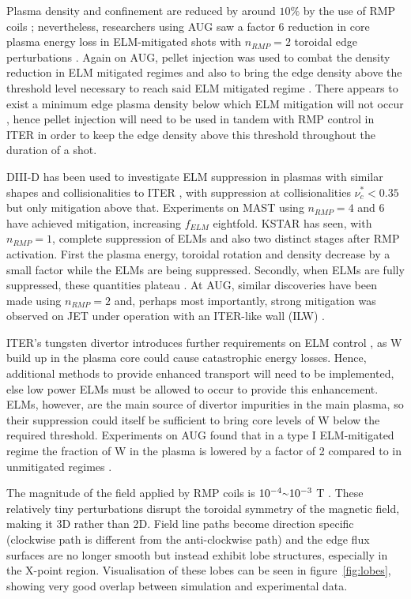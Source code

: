 \documentclass[11pt, twocolumn]{article}  %
\providecommand{\squiggle}{\raise.17ex\hbox{$\scriptstyle\sim$}} %
\begin{document}
Plasma density and confinement are reduced by around $10\%$ by the use of RMP coils \cite{Lang2013}; nevertheless, researchers using AUG saw a factor 6 reduction in core plasma energy loss in ELM-mitigated shots with $n_{RMP}=2$ toroidal edge perturbations \cite{Suttrop2011}. Again on AUG, pellet injection was used to combat the density reduction in ELM mitigated regimes and also to bring the edge density above the threshold level necessary to reach said ELM mitigated regime \cite{Lang2012}. There appears to exist a minimum edge plasma density below which ELM mitigation will not occur \cite{Suttrop2011}, hence pellet injection will need to be used in tandem with RMP control in ITER in order to keep the edge density above this threshold throughout the duration of a shot.

DIII-D has been used to investigate ELM suppression in plasmas with similar shapes and collisionalities to ITER \cite{Evans2008,Lanctot2013,Mordijck2011}, with suppression at collisionalities $\nu_c^* < 0.35$ but only mitigation above that. Experiments on MAST \cite{Kirk2013a} using $n_{RMP}=4 $ and $6$ have achieved mitigation, increasing $f_{ELM}$ eightfold. KSTAR has seen, with $n_{RMP}=1$, complete suppression of ELMs and also two distinct stages after RMP activation. First the plasma energy, toroidal rotation and density decrease by a small factor while the ELMs are being suppressed. Secondly, when ELMs are fully suppressed, these quantities plateau \cite{Kwak2013}. At AUG, similar discoveries have been made using $n_{RMP}=2$ \cite{Fischer2012,Suttrop2011} and, perhaps most importantly, strong mitigation was observed on JET under operation with an ITER-like wall (ILW) \cite{Liang2013}. 

ITER's tungsten divertor introduces further requirements on ELM control \cite{KirkFF}, as W build up in the plasma core could cause catastrophic energy losses. Hence, additional methods to provide enhanced transport will need to be implemented, else low power ELMs must be allowed to occur to provide this enhancement. ELMs, however, are the main source of divertor impurities in the main plasma, so their suppression could itself be sufficient to bring core levels of W below the required threshold. Experiments on AUG found that in a type I ELM-mitigated regime the fraction of W in the plasma is lowered by a factor of 2 compared to in unmitigated regimes \cite{Suttrop2011}.

The magnitude of the field applied by RMP coils is $10^{-4} \squiggle 10^{-3}$ T \cite{Evans2015}. These relatively tiny perturbations disrupt the toroidal symmetry of the magnetic field, making it 3D rather than 2D. Field line paths become direction specific (clockwise path is different from the anti-clockwise path) and the edge flux surfaces are no longer smooth but instead exhibit lobe structures, especially in the X-point region. Visualisation of these lobes can be seen in figure~\ref{fig:lobes}, showing very good overlap between simulation and experimental data.
\end{document}
